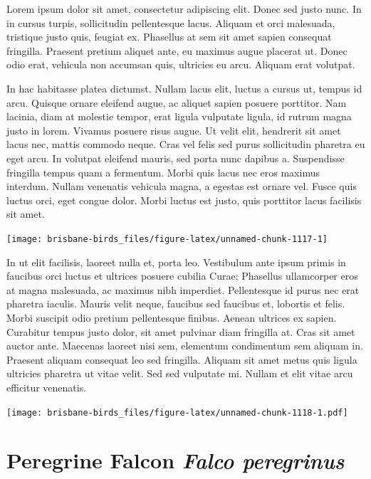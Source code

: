 \documentclass[]{book}
\let\origfigure\figure
\let\endorigfigure\endfigure
\renewenvironment{figure}[1][2] {
  \expandafter\origfigure\expandafter[H]
} {
  \endorigfigure
}
\begin{document}
Lorem ipsum dolor sit amet, consectetur adipiscing elit. Donec sed justo
nunc. In in cursus turpis, sollicitudin pellentesque lacus. Aliquam et
orci malesuada, tristique justo quis, feugiat ex. Phasellus at sem sit
amet sapien consequat fringilla. Praesent pretium aliquet ante, eu
maximus augue placerat ut. Donec odio erat, vehicula non accumsan quis,
ultricies eu arcu. Aliquam erat volutpat.

In hac habitasse platea dictumst. Nullam lacus elit, luctus a cursus ut,
tempus id arcu. Quisque ornare eleifend augue, ac aliquet sapien posuere
porttitor. Nam lacinia, diam at molestie tempor, erat ligula vulputate
ligula, id rutrum magna justo in lorem. Vivamus posuere risus augue. Ut
velit elit, hendrerit sit amet lacus nec, mattis commodo neque. Cras vel
felis sed purus sollicitudin pharetra eu eget arcu. In volutpat eleifend
mauris, sed porta nunc dapibus a. Suspendisse fringilla tempus quam a
fermentum. Morbi quis lacus nec eros maximus interdum. Nullam venenatis
vehicula magna, a egestas est ornare vel. Fusce quis luctus orci, eget
congue dolor. Morbi luctus est justo, quis porttitor lacus facilisis sit
amet.

\begin{figure}
\texttt{[image: brisbane-birds\_files/figure-latex/unnamed-chunk-1117-1]} \caption{insert figure caption}\label{fig:unnamed-chunk-1117}
\end{figure}

In ut elit facilisis, laoreet nulla et, porta leo. Vestibulum ante ipsum
primis in faucibus orci luctus et ultrices posuere cubilia Curae;
Phasellus ullamcorper eros at magna malesuada, ac maximus nibh
imperdiet. Pellentesque id purus nec erat pharetra iaculis. Mauris velit
neque, faucibus sed faucibus et, lobortis et felis. Morbi suscipit odio
pretium pellentesque finibus. Aenean ultrices ex sapien. Curabitur
tempus justo dolor, sit amet pulvinar diam fringilla at. Cras sit amet
auctor ante. Maecenas laoreet nisi sem, elementum condimentum sem
aliquam in. Praesent aliquam consequat leo sed fringilla. Aliquam sit
amet metus quis ligula ultricies pharetra ut vitae velit. Sed sed
vulputate mi. Nullam et elit vitae arcu efficitur venenatis.

\begin{figure}
\centering
\texttt{[image: brisbane-birds\_files/figure-latex/unnamed-chunk-1118-1.pdf]}
\caption{\label{fig:unnamed-chunk-1118}insert figure caption}
\end{figure}

\section{\texorpdfstring{Peregrine Falcon \emph{Falco
peregrinus}}{Peregrine Falcon Falco peregrinus}}\label{peregrine-falcon-falco-peregrinus}
\end{document}
